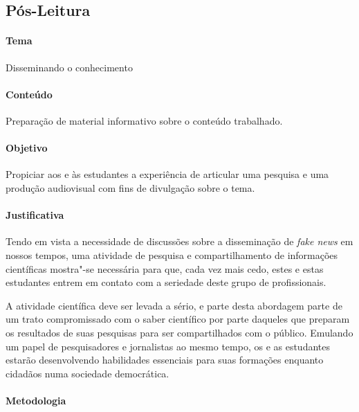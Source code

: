 \documentclass[11pt]{extarticle}
\begin{document}
\subsection{Pós-Leitura}

\paragraph{Tema} Disseminando o conhecimento

\paragraph{Conteúdo} Preparação de material informativo sobre o conteúdo trabalhado.

\paragraph{Objetivo} Propiciar aos e às estudantes a experiência de articular
uma pesquisa e uma produção audiovisual com fins de divulgação sobre o tema.

\paragraph{Justificativa} Tendo em vista a necessidade de discussões sobre
a disseminação de \textit{fake news} em nossos tempos, uma atividade de pesquisa
e compartilhamento de informações científicas mostra"-se necessária para que,
cada vez mais cedo, estes e estas estudantes entrem em contato com a seriedade
deste grupo de profissionais. 

A atividade científica deve ser levada a sério,
e parte desta abordagem parte de um trato compromissado com o saber científico
por parte daqueles que preparam os resultados de suas pesquisas para
ser compartilhados com o público. Emulando um papel de pesquisadores
e jornalistas ao mesmo tempo, os e as estudantes estarão desenvolvendo
habilidades essenciais para suas formações enquanto cidadãos numa sociedade
democrática. 

\paragraph{Metodologia} 
\end{document}
